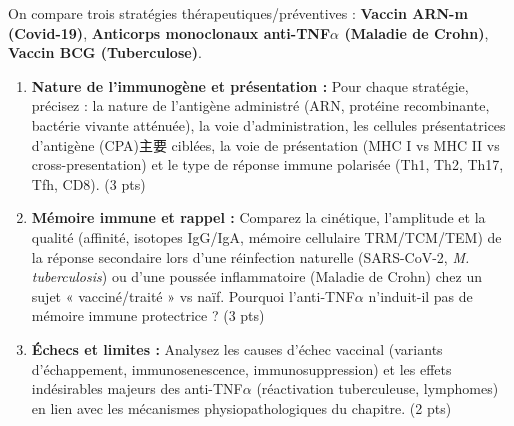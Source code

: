 \documentclass[11pt]{article}
\begin{document}
\begin{exercice}
On compare trois stratégies thérapeutiques/préventives : \textbf{Vaccin ARN-m (Covid-19)}, \textbf{Anticorps monoclonaux anti-TNF$\alpha$ (Maladie de Crohn)}, \textbf{Vaccin BCG (Tuberculose)}.

\begin{enumerate}
    \item \textbf{Nature de l'immunogène et présentation :} Pour chaque stratégie, précisez : la nature de l'antigène administré (ARN, protéine recombinante, bactérie vivante atténuée), la voie d'administration, les cellules présentatrices d'antigène (CPA)主要 ciblées, la voie de présentation (MHC I vs MHC II vs cross-presentation) et le type de réponse immune polarisée (Th1, Th2, Th17, Tfh, CD8). (3 pts)
    \item \textbf{Mémoire immune et rappel :} Comparez la cinétique, l'amplitude et la qualité (affinité, isotopes IgG/IgA, mémoire cellulaire TRM/TCM/TEM) de la réponse secondaire lors d'une réinfection naturelle (SARS-CoV-2, \textit{M. tuberculosis}) ou d'une poussée inflammatoire (Maladie de Crohn) chez un sujet « vacciné/traité » vs naïf. Pourquoi l'anti-TNF$\alpha$ n'induit-il pas de mémoire immune protectrice ? (3 pts)
    \item \textbf{Échecs et limites :} Analysez les causes d'échec vaccinal (variants d'échappement, immunosenescence, immunosuppression) et les effets indésirables majeurs des anti-TNF$\alpha$ (réactivation tuberculeuse, lymphomes) en lien avec les mécanismes physiopathologiques du chapitre. (2 pts)
\end{enumerate}
\end{exercice}
\end{document}
